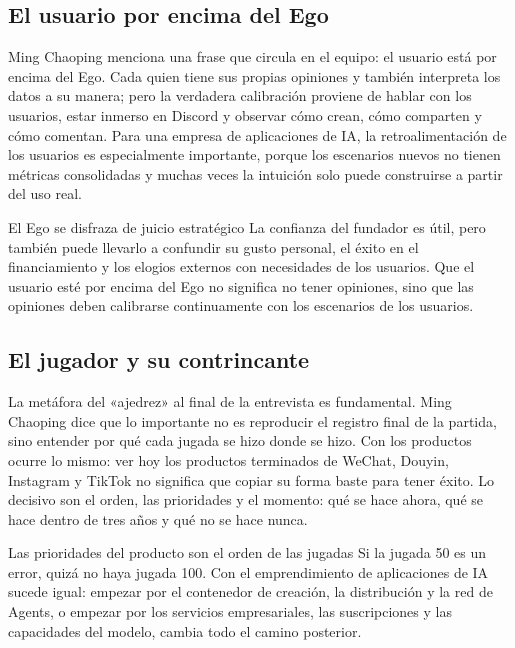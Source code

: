 \documentclass[a4paper]{article}
\begin{document}
\subsection{El usuario por encima del Ego}

Ming Chaoping menciona una frase que circula en el equipo: el usuario está por encima del Ego. Cada quien tiene sus propias opiniones y también interpreta los datos a su manera; pero la verdadera calibración proviene de hablar con los usuarios, estar inmerso en Discord y observar cómo crean, cómo comparten y cómo comentan. Para una empresa de aplicaciones de IA, la retroalimentación de los usuarios es especialmente importante, porque los escenarios nuevos no tienen métricas consolidadas y muchas veces la intuición solo puede construirse a partir del uso real.

\begin{warningbox}{El Ego se disfraza de juicio estratégico}
La confianza del fundador es útil, pero también puede llevarlo a confundir su gusto personal, el éxito en el financiamiento y los elogios externos con necesidades de los usuarios. Que el usuario esté por encima del Ego no significa no tener opiniones, sino que las opiniones deben calibrarse continuamente con los escenarios de los usuarios.
\end{warningbox}

\subsection{El jugador y su contrincante}

La metáfora del «ajedrez» al final de la entrevista es fundamental. Ming Chaoping dice que lo importante no es reproducir el registro final de la partida, sino entender por qué cada jugada se hizo donde se hizo. Con los productos ocurre lo mismo: ver hoy los productos terminados de WeChat, Douyin, Instagram y TikTok no significa que copiar su forma baste para tener éxito. Lo decisivo son el orden, las prioridades y el momento: qué se hace ahora, qué se hace dentro de tres años y qué no se hace nunca.

\begin{importantbox}{Las prioridades del producto son el orden de las jugadas}
Si la jugada 50 es un error, quizá no haya jugada 100. Con el emprendimiento de aplicaciones de IA sucede igual: empezar por el contenedor de creación, la distribución y la red de Agents, o empezar por los servicios empresariales, las suscripciones y las capacidades del modelo, cambia todo el camino posterior.
\end{importantbox}
\end{document}
